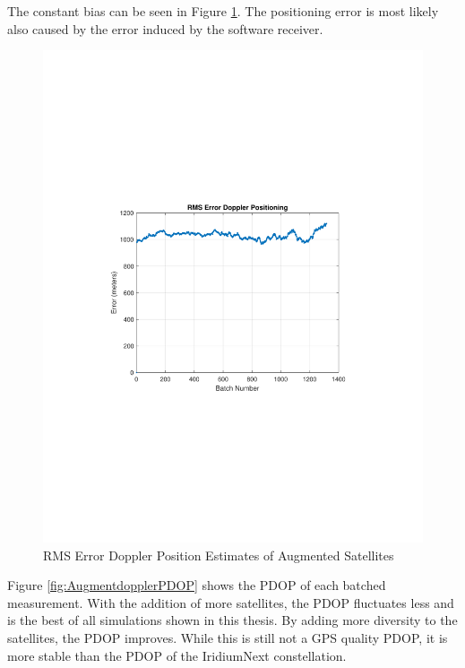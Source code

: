 \documentclass[12pt]{report}
\begin{document}
The constant bias can be seen in Figure \ref{fig:AugmentdopplerRMSE}. The positioning error is most likely also caused by the error induced by the software receiver. 
\begin{figure}[h!]
    \centering
    \includegraphics[trim=1.2in 3.3in 1.75in 3.3in,clip,width=5in]
    {Augment_5min_Doppler_RMSE.pdf}
    \caption{RMS Error Doppler Position Estimates of Augmented Satellites}
    \label{fig:AugmentdopplerRMSE}
\end{figure}
Figure \ref{fig:AugmentdopplerPDOP} shows the PDOP of each batched measurement. With the addition of more satellites, the PDOP fluctuates less and is the best of all simulations shown in this thesis. By adding more diversity to the satellites, the PDOP improves. While this is still not a GPS quality PDOP, it is more stable than the PDOP of the IridiumNext constellation.
\end{document}
